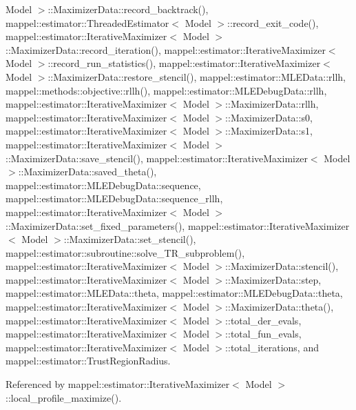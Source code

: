 Model $>$\+::\+Maximizer\+Data\+::record\+\_\+backtrack(), mappel\+::estimator\+::\+Threaded\+Estimator$<$ Model $>$\+::record\+\_\+exit\+\_\+code(), mappel\+::estimator\+::\+Iterative\+Maximizer$<$ Model $>$\+::\+Maximizer\+Data\+::record\+\_\+iteration(), mappel\+::estimator\+::\+Iterative\+Maximizer$<$ Model $>$\+::record\+\_\+run\+\_\+statistics(), mappel\+::estimator\+::\+Iterative\+Maximizer$<$ Model $>$\+::\+Maximizer\+Data\+::restore\+\_\+stencil(), mappel\+::estimator\+::\+M\+L\+E\+Data\+::rllh, mappel\+::methods\+::objective\+::rllh(), mappel\+::estimator\+::\+M\+L\+E\+Debug\+Data\+::rllh, mappel\+::estimator\+::\+Iterative\+Maximizer$<$ Model $>$\+::\+Maximizer\+Data\+::rllh, mappel\+::estimator\+::\+Iterative\+Maximizer$<$ Model $>$\+::\+Maximizer\+Data\+::s0, mappel\+::estimator\+::\+Iterative\+Maximizer$<$ Model $>$\+::\+Maximizer\+Data\+::s1, mappel\+::estimator\+::\+Iterative\+Maximizer$<$ Model $>$\+::\+Maximizer\+Data\+::save\+\_\+stencil(), mappel\+::estimator\+::\+Iterative\+Maximizer$<$ Model $>$\+::\+Maximizer\+Data\+::saved\+\_\+theta(), mappel\+::estimator\+::\+M\+L\+E\+Debug\+Data\+::sequence, mappel\+::estimator\+::\+M\+L\+E\+Debug\+Data\+::sequence\+\_\+rllh, mappel\+::estimator\+::\+Iterative\+Maximizer$<$ Model $>$\+::\+Maximizer\+Data\+::set\+\_\+fixed\+\_\+parameters(), mappel\+::estimator\+::\+Iterative\+Maximizer$<$ Model $>$\+::\+Maximizer\+Data\+::set\+\_\+stencil(), mappel\+::estimator\+::subroutine\+::solve\+\_\+\+T\+R\+\_\+subproblem(), mappel\+::estimator\+::\+Iterative\+Maximizer$<$ Model $>$\+::\+Maximizer\+Data\+::stencil(), mappel\+::estimator\+::\+Iterative\+Maximizer$<$ Model $>$\+::\+Maximizer\+Data\+::step, mappel\+::estimator\+::\+M\+L\+E\+Data\+::theta, mappel\+::estimator\+::\+M\+L\+E\+Debug\+Data\+::theta, mappel\+::estimator\+::\+Iterative\+Maximizer$<$ Model $>$\+::\+Maximizer\+Data\+::theta(), mappel\+::estimator\+::\+Iterative\+Maximizer$<$ Model $>$\+::total\+\_\+der\+\_\+evals, mappel\+::estimator\+::\+Iterative\+Maximizer$<$ Model $>$\+::total\+\_\+fun\+\_\+evals, mappel\+::estimator\+::\+Iterative\+Maximizer$<$ Model $>$\+::total\+\_\+iterations, and mappel\+::estimator\+::\+Trust\+Region\+Radius.



Referenced by mappel\+::estimator\+::\+Iterative\+Maximizer$<$ Model $>$\+::local\+\_\+profile\+\_\+maximize().

